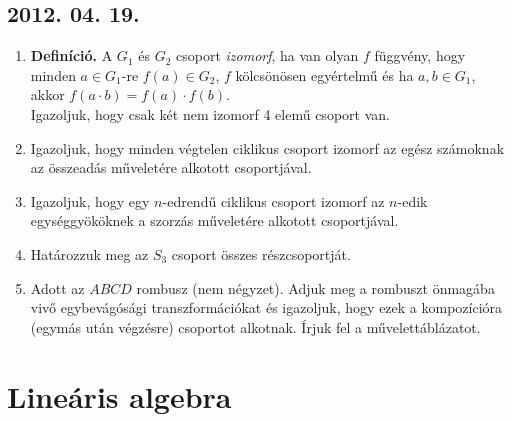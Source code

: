\subsection*{2012. 04. 19.}
\begin{enumerate}
\item \textbf{Definíció.} A $G_1$ és $G_2$ csoport \emph{izomorf}, ha van olyan $f$ függvény, hogy minden $a\in G_1$-re $f(a)\in G_2$, $f$ kölcsönösen egyértelmű és ha $a,b\in G_1$, akkor $f(a\cdot b)=f(a)\cdot f(b)$.\\
Igazoljuk, hogy csak két nem izomorf 4 elemű csoport van.
\item Igazoljuk, hogy minden végtelen ciklikus csoport izomorf az egész számoknak az összeadás műveletére alkotott csoportjával.
\item Igazoljuk, hogy egy $n$-edrendű ciklikus csoport izomorf az $n$-edik egységgyököknek a szorzás műveletére alkotott csoportjával.
\item Határozzuk meg az $S_3$ csoport összes részcsoportját.
\item Adott az $ABCD$ rombusz (nem négyzet). Adjuk meg a rombuszt önmagába vivő egybevágósági transzformációkat és igazoljuk, hogy ezek a kompozícióra (egymás után végzésre) csoportot alkotnak. Írjuk fel a művelettáblázatot.
\end{enumerate}

\section{Lineáris algebra}

